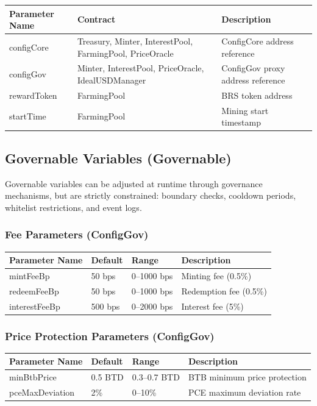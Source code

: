 \documentclass{article}
\begin{document}
\begin{center}
\begin{longtable}{p{4cm}p{3cm}p{7cm}}
\toprule
Parameter Name & Contract & Description \\
\midrule
\endhead
configCore & Treasury, Minter, InterestPool, FarmingPool, PriceOracle & ConfigCore address reference \\
configGov & Minter, InterestPool, PriceOracle, IdealUSDManager & ConfigGov proxy address reference \\
rewardToken & FarmingPool & BRS token address \\
startTime & FarmingPool & Mining start timestamp \\
\bottomrule
\end{longtable}
\end{center}

\subsection{Governable Variables (Governable)}

Governable variables can be adjusted at runtime through governance mechanisms, but are strictly constrained: boundary checks, cooldown periods, whitelist restrictions, and event logs.

\subsubsection{Fee Parameters (ConfigGov)}

\begin{center}
\begin{longtable}{p{4cm}p{2.5cm}p{2.5cm}p{5cm}}
\toprule
Parameter Name & Default & Range & Description \\
\midrule
\endhead
mintFeeBp & 50 bps & 0--1000 bps & Minting fee (0.5\%) \\
redeemFeeBp & 50 bps & 0--1000 bps & Redemption fee (0.5\%) \\
interestFeeBp & 500 bps & 0--2000 bps & Interest fee (5\%) \\
\bottomrule
\end{longtable}
\end{center}

\subsubsection{Price Protection Parameters (ConfigGov)}

{\small
\begin{center}
\begin{longtable}{p{5cm}p{2.5cm}p{3cm}p{3.5cm}}
\toprule
Parameter Name & Default & Range & Description \\
\midrule
\endhead
minBtbPrice & 0.5 BTD & 0.3--0.7 BTD & BTB minimum price protection \\
pceMaxDeviation & 2\% & 0--10\% & PCE maximum deviation rate \\
\bottomrule
\end{longtable}
\end{center}
}
\end{document}
